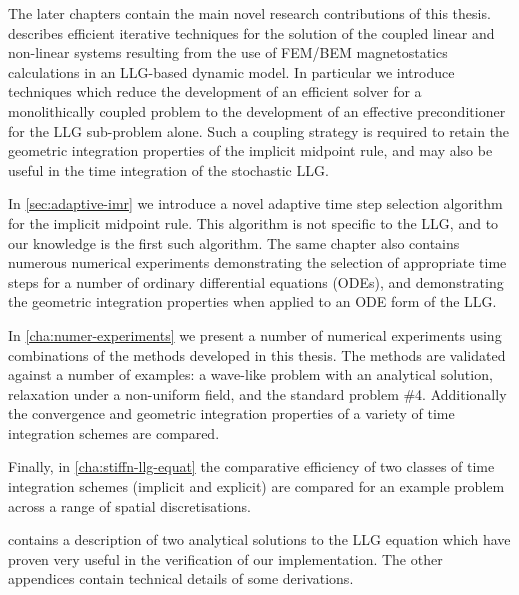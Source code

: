 The later chapters contain the main novel research contributions of this thesis.
 describes efficient iterative techniques for the solution of the coupled linear and non-linear systems resulting from the use of FEM/BEM magnetostatics calculations in an LLG-based dynamic model.
In particular we introduce techniques which reduce the development of an efficient solver for a monolithically coupled problem to the development of an effective preconditioner for the LLG sub-problem alone.
Such a coupling strategy is required to retain the geometric integration properties of the implicit midpoint rule, and may also be useful in the time integration of the stochastic LLG.

In \cref{sec:adaptive-imr} we introduce a novel adaptive time step selection algorithm for the implicit midpoint rule.
This algorithm is not specific to the LLG, and to our knowledge is the first such algorithm.
The same chapter also contains numerous numerical experiments demonstrating the selection of appropriate time steps for a number of ordinary differential equations (ODEs), and demonstrating the geometric integration properties when applied to an ODE form of the LLG.

In \cref{cha:numer-experiments} we present a number of numerical experiments using combinations of the methods developed in this thesis.
The methods are validated against a number of examples: a wave-like problem with an analytical solution, relaxation under a non-uniform field, and the \mumag standard problem \#4.
Additionally the convergence and geometric integration properties of a variety of time integration schemes are compared.

Finally, in \cref{cha:stiffn-llg-equat} the comparative efficiency of two classes of time integration schemes (implicit and explicit) are compared for an example problem across a range of spatial discretisations.

 contains a description of two analytical solutions to the LLG equation which have proven very useful in the verification of our implementation.
The other appendices contain technical details of some derivations.


